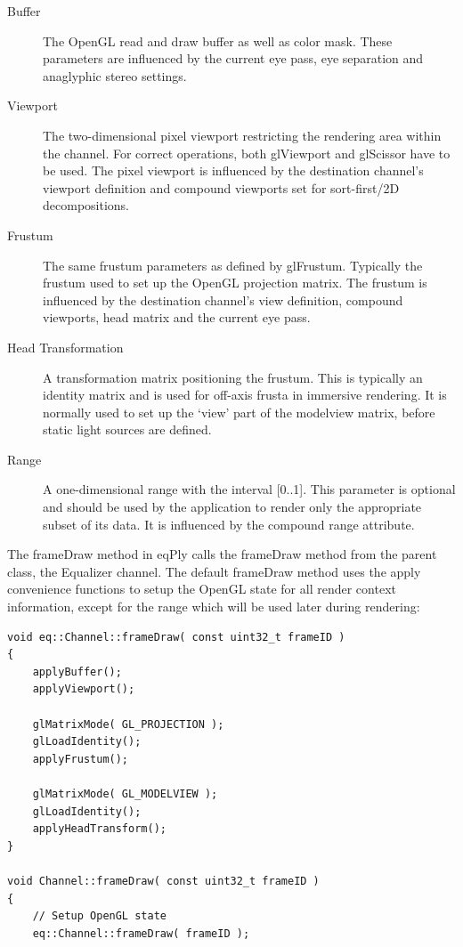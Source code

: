 \documentclass[10pt,a4]{scrartcl}
\begin{document}
\begin{description}
\item[Buffer] The OpenGL read and draw buffer as well as color mask.
  These parameters are influenced by the current eye pass, eye
  separation and anaglyphic stereo settings.
\item[Viewport] The two-dimensional pixel viewport restricting the
  rendering area within the channel. For correct operations, both
  \textsf{glViewport} and \textsf{glScissor} have to be used. The pixel
  viewport is influenced by the destination channel's viewport
  definition and compound viewports set for sort-first/2D decompositions.
\item[Frustum] The same frustum parameters as defined by
  \textsf{glFrustum}. Typically the frustum used to set up the OpenGL
  projection matrix. The frustum is influenced by the destination
  channel's view definition, compound viewports, head matrix and the
  current eye pass.
\item[Head Transformation] A transformation matrix positioning the
  frustum. This is typically an identity matrix and is used for off-axis
  frusta in immersive rendering. It is normally used to set up the
  `view' part of the modelview matrix, before static light sources are
  defined.
\item[Range] A one-dimensional range with the interval [0..1]. This
  parameter is optional and should be used by the application to render
  only the appropriate subset of its data. It is influenced by the
  compound range attribute.
\end{description}

The \textsf{frameDraw} method in \textsf{eqPly} calls the
\textsf{frameDraw} method from the parent class, the Equalizer
channel. The default \textsf{frameDraw} method uses the apply
convenience functions to setup the OpenGL state for all render context
information, except for the range which will be used later during
rendering:

{\footnotesize\begin{lstlisting}
void eq::Channel::frameDraw( const uint32_t frameID )
{
    applyBuffer();
    applyViewport();
    
    glMatrixMode( GL_PROJECTION );
    glLoadIdentity();
    applyFrustum();

    glMatrixMode( GL_MODELVIEW );
    glLoadIdentity();
    applyHeadTransform();
}

void Channel::frameDraw( const uint32_t frameID )
{
    // Setup OpenGL state
    eq::Channel::frameDraw( frameID );
\end{lstlisting}}
\end{document}
